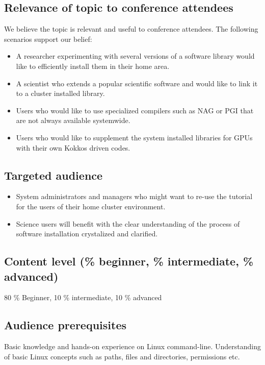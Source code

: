 \documentclass{report}
\begin{document}
\subsection*{Relevance of topic to conference attendees}
We believe the topic is relevant and useful to conference attendees. The following scenarios support our belief:
\begin{itemize}
\item A researcher experimenting with several versions of a software library would like to efficiently install them in their home area.
\item A scientist who extends a popular scientific software and would like to link it to a cluster installed library.
\item Users who would like to use specialized compilers such as NAG or PGI that are not always available systemwide.
\item Users who would like to supplement the system installed libraries for GPUs with their own Kokkos driven codes.
\end{itemize}

\subsection*{Targeted audience}
\begin{itemize}
\item System administrators and managers who might want to re-use the tutorial for the users of their home cluster environment.
\item Science users will benefit with the clear understanding of the process of software installation crystalized and clarified.
\end{itemize}
\subsection*{Content level (\% beginner, \% intermediate, \% advanced)}
80 \% Beginner, 10 \% intermediate, 10 \% advanced
\subsection*{Audience prerequisites}
Basic knowledge and hands-on experience on Linux command-line. Understanding of
basic Linux concepts such as paths, files and directories, permissions etc.
\end{document}
